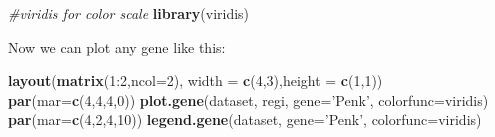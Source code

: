 \documentclass[]{book}
\newenvironment{Shaded}{\begin{snugshade}}{\end{snugshade}}
\newcommand{\KeywordTok}[1]{\textcolor[rgb]{0.13,0.29,0.53}{\textbf{{#1}}}}
\newcommand{\DataTypeTok}[1]{\textcolor[rgb]{0.13,0.29,0.53}{{#1}}}
\newcommand{\DecValTok}[1]{\textcolor[rgb]{0.00,0.00,0.81}{{#1}}}
\newcommand{\FloatTok}[1]{\textcolor[rgb]{0.00,0.00,0.81}{{#1}}}
\newcommand{\StringTok}[1]{\textcolor[rgb]{0.31,0.60,0.02}{{#1}}}
\newcommand{\CommentTok}[1]{\textcolor[rgb]{0.56,0.35,0.01}{\textit{{#1}}}}
\newcommand{\NormalTok}[1]{{#1}}
\theoremstyle{definition}
\theoremstyle{definition}
\theoremstyle{remark}
\begin{document}
\begin{Shaded}
\end{Shaded}

\begin{Shaded}
\begin{Highlighting}[]
\CommentTok{#viridis for color scale}
\KeywordTok{library}\NormalTok{(viridis)}
\end{Highlighting}
\end{Shaded}

Now we can plot any gene like this:

\begin{Shaded}
\begin{Highlighting}[]
\KeywordTok{layout}\NormalTok{(}\KeywordTok{matrix}\NormalTok{(}\DecValTok{1}\NormalTok{:}\DecValTok{2}\NormalTok{,}\DataTypeTok{ncol=}\DecValTok{2}\NormalTok{), }\DataTypeTok{width =} \KeywordTok{c}\NormalTok{(}\DecValTok{4}\NormalTok{,}\DecValTok{3}\NormalTok{),}\DataTypeTok{height =} \KeywordTok{c}\NormalTok{(}\DecValTok{1}\NormalTok{,}\DecValTok{1}\NormalTok{))}
\KeywordTok{par}\NormalTok{(}\DataTypeTok{mar=}\KeywordTok{c}\NormalTok{(}\DecValTok{4}\NormalTok{,}\DecValTok{4}\NormalTok{,}\DecValTok{4}\NormalTok{,}\DecValTok{0}\NormalTok{))}
\KeywordTok{plot.gene}\NormalTok{(dataset, regi, }\DataTypeTok{gene=}\StringTok{'Penk'}\NormalTok{, }\DataTypeTok{colorfunc=}\NormalTok{viridis)}
\KeywordTok{par}\NormalTok{(}\DataTypeTok{mar=}\KeywordTok{c}\NormalTok{(}\DecValTok{4}\NormalTok{,}\DecValTok{2}\NormalTok{,}\DecValTok{4}\NormalTok{,}\DecValTok{10}\NormalTok{))}
\KeywordTok{legend.gene}\NormalTok{(dataset, }\DataTypeTok{gene=}\StringTok{'Penk'}\NormalTok{, }\DataTypeTok{colorfunc=}\NormalTok{viridis)}
\end{Highlighting}
\end{Shaded}
\end{document}
